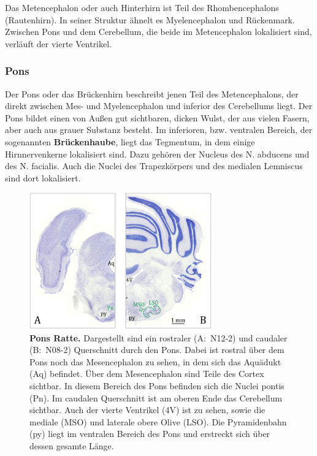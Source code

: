 \documentclass[12pt,a4paper,pdftex]{article}
\begin{document}
Das Metencephalon oder auch Hinterhirn ist Teil des Rhombencephalons (Rautenhirn). In seiner Struktur ähnelt es Myelencephalon und Rückenmark. Zwischen Pons und dem Cerebellum, die beide im Metencephalon lokalisiert sind, verläuft der vierte Ventrikel.


\subsubsection{Pons}
\label{subsubsec:Pons} 

Der Pons oder das Brückenhirn beschreibt jenen Teil des Metencephalons, der direkt zwischen Mes- und Myelencephalon und inferior des Cerebellums liegt. Der Pons bildet einen von Außen gut sichtbaren, dicken Wulst, der aus vielen Fasern, aber auch aus grauer Substanz besteht. Im inferioren, bzw. ventralen Bereich, der sogenannten \textbf{Brückenhaube}, liegt das Tegmentum, in dem einige Hirnnervenkerne lokalisiert sind. Dazu gehören der Nucleus des N. abducens und des N. facialis. Auch die Nuclei des Trapezkörpers und des medialen Lemniscus sind dort lokalisiert.

\begin{figure}[H]
    \centering
    \includegraphics[width=0.7\textwidth]{pictures/Bilder_Jule/Ratte/pons.png}
    \caption[Pons Ratte]{\textbf{Pons Ratte.} Dargestellt sind ein rostraler (A:~N12-2) und caudaler (B:~N08-2) Querschnitt durch den Pons. Dabei ist rostral über dem Pons noch das Mesencephalon zu sehen, in dem sich das Aquädukt (Aq) befindet. Über dem Mesencephalon sind Teile des Cortex sichtbar. In diesem Bereich des Pons befinden sich die Nuclei pontis (Pn). Im caudalen Querschnitt ist am oberen Ende das Cerebellum sichtbar. Auch der vierte Ventrikel (4V) ist zu sehen, sowie die mediale (MSO) und laterale obere Olive (LSO). Die Pyramidenbahn (py) liegt im ventralen Bereich des Pons und erstreckt sich über dessen gesamte Länge.}
    \label{fig:pons_ratte}
\end{figure}{}
\end{document}
